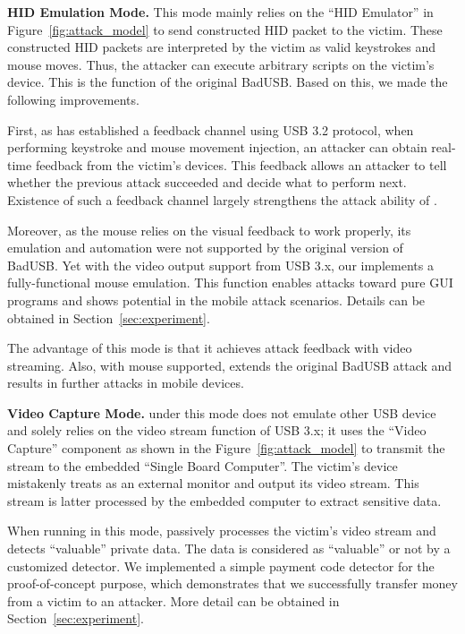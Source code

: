 \textbf{\ac{HID} Emulation Mode.} This mode mainly relies on the ``\ac{HID} Emulator'' in Figure~\ref{fig:attack_model} to
send constructed \ac{HID} packet to the victim. These constructed \ac{HID} packets are
interpreted by the victim as valid keystrokes and mouse moves. Thus, the
attacker can execute arbitrary scripts on the victim's device. This is the
function of the original BadUSB. Based on this, we made the following
improvements.

First, as \tool has established a feedback channel using \ac{USB} 3.2 protocol, when performing keystroke and mouse movement injection, an attacker can obtain real-time feedback from the victim's devices. This feedback allows an attacker to tell whether the previous attack succeeded and decide what to perform next. Existence of such a feedback channel largely strengthens the attack ability of \tool.

Moreover, as the mouse relies on the visual feedback to work properly, its
emulation and automation were not supported by the original version of BadUSB.
Yet with the video output support from \ac{USB} 3.x, our \tool implements a
fully-functional mouse emulation. This function enables attacks toward pure \ac{GUI}
programs and shows potential in the mobile attack scenarios. Details can
be obtained in Section~\ref{sec:experiment}.

The advantage of this mode is that it achieves attack
feedback with video streaming.
Also, with mouse
supported, \tool extends the original BadUSB attack and results in further attacks in
mobile devices.

\textbf{Video Capture Mode.} \tool under this mode does not emulate other
USB device and solely relies on the video stream function of \ac{USB} 3.x; it uses the
``Video Capture'' component as shown in the Figure~\ref{fig:attack_model} to transmit the stream to the embedded ``Single Board Computer''.
The victim's device mistakenly treats \tool as an external monitor
and output its video stream. This stream is latter processed by the embedded
computer to extract sensitive data.

When running in this mode, \tool passively processes the victim's video stream
and detects ``valuable'' private data.  The data is considered as
``valuable'' or not by a customized detector. We implemented a simple
payment code detector for the proof-of-concept purpose, which demonstrates that we successfully transfer money from a victim to an
attacker. More detail can be obtained in Section~\ref{sec:experiment}.

